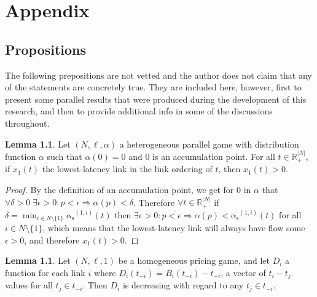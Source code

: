 \documentclass[10pt,a4paper]{book}
\newcommand{\as}{\mathrm{\alpha_s}}
\newcommand{\R}{\mathbb{R}}
\theoremstyle{definition}
\newtheorem{lemma}[definition]{Lemma}
\theoremstyle{comment}
\begin{document}
\chapter{Appendix}
\label{chapter:appendix}

\section*{Propositions}

The following prepositions are not vetted and the author does not claim that any of the statements are concretely true.
They are included here, however, first to present some parallel results that were produced during the development of this research, and then to provide additional info in some of the discussions throughout.

\begin{lemma}
	\label{lemma:a_0_accumulation_point}
	Let $(N, \ell, \alpha)$ a heterogeneous parallel game with distribution function $\alpha$ such that $\alpha(0) = 0$ and $0$ is an accumulation point.
	For all $t \in \R_+^{|N|}$, if $x_1(t)$ the lowest-latency link in the link ordering of $t$, then $x_1(t) > 0$.
\end{lemma}

\begin{proof}
	By the definition of an accumulation point, we get for $0$ in $\alpha$ that $\forall \delta > 0 \; \exists \epsilon > 0: p < \epsilon \Rightarrow \alpha(p) < \delta$.
	Therefore $\forall t \in \R_+^{|N|}$ if $\delta = \min_{i \in N \setminus \{1\}}\as^{(1, i)}(t)$ then $\exists \epsilon > 0: p < \epsilon \Rightarrow \alpha(p) < \as^{(1, i)}(t)$ for all $i \in N \setminus \{1\}$, which means that the lowest-latency link will always have flow some $\epsilon > 0$, and therefore $x_1(t) > 0$.
\end{proof}

\begin{lemma}
	\label{lemma:tolls_diff}
	Let $(N, \ell, 1)$ be a homogeneous pricing game, and let $D_i$ a function for each link $i$ where $D_i(t_{-i}) = B_i(t_{-i}) - t_{-i}$, a vector of $t_i - t_j$ values for all $t_j \in t_{-i}$.
	Then $D_i$ is decreasing with regard to any $t_j \in t_{-i}$.
\end{lemma}
\end{document}
